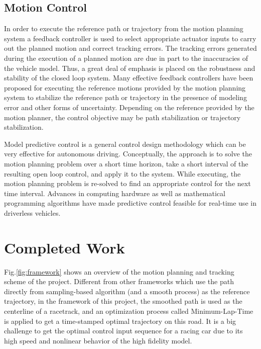 \documentclass[conference, onecolumn]{IEEEtran}
\begin{document}
\subsection{Motion Control}
In order to execute the reference path or trajectory from the motion planning system a feedback controller is used to select appropriate actuator inputs to carry out the planned motion and correct tracking errors. The tracking errors generated during the execution of a planned motion are due in part to the inaccuracies of the vehicle model. Thus, a great deal of emphasis is placed on the robustness and stability of the closed
loop system.
Many effective feedback controllers have been proposed
for executing the reference motions provided by the motion planning system to stabilize the reference path or trajectory in the presence of modeling error and other forms of uncertainty. Depending on the reference provided by the motion planner, the control objective may be path stabilization or trajectory stabilization.


Model predictive control is a general control design
methodology which can be very effective for autonomous driving. Conceptually, the approach is to solve the motion planning problem over a short time horizon, take a short interval of the resulting open loop control, and apply it to the system. While executing, the motion planning problem is re-solved to find an appropriate control for the next time interval. Advances in computing hardware as well as mathematical programming
algorithms have made predictive control feasible for real-time use in driverless vehicles. 


\section{Completed Work}

Fig.\ref{fig:framework} shows an overview of the motion planning and tracking scheme of the project. Different from other frameworks which use the path directly from sampling-based algorithm (and a smooth process) as the reference trajectory, in the framework of this project, the smoothed path is used as the centerline of a racetrack, and an optimization process called Minimum-Lap-Time is applied to get a time-stamped optimal trajectory on this road. It is a big challenge to get the optimal control input sequence for a racing car due to its high speed and nonlinear behavior of the high fidelity model. 
\end{document}
